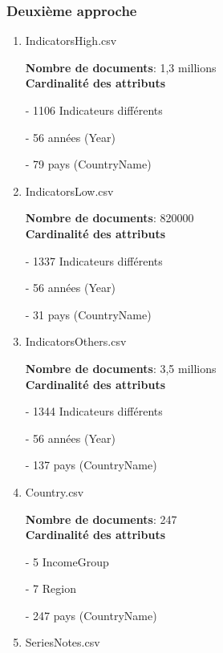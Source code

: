  \subsubsection{Deuxième approche}

\begin{enumerate}
    \item IndicatorsHigh.csv
\vspace{2mm}

\textbf{Nombre de documents}: 1,3 millions \\
\textbf{Cardinalité des attributs}

     - 1106 Indicateurs différents 
     
     - 56 années (Year)
     
     - 79 pays (CountryName)

     \item IndicatorsLow.csv
\vspace{2mm}

\textbf{Nombre de documents}: 820000 \\
\textbf{Cardinalité des attributs}

     - 1337 Indicateurs différents 
     
     - 56 années (Year)
     
     - 31 pays (CountryName)

     \item IndicatorsOthers.csv
\vspace{2mm}

\textbf{Nombre de documents}: 3,5 millions \\
\textbf{Cardinalité des attributs}

     - 1344 Indicateurs différents 
     
     - 56 années (Year)
     
     - 137 pays (CountryName)

\vspace{2mm}
    \item Country.csv
\vspace{2mm}

\textbf{Nombre de documents}: 247 \\
\textbf{Cardinalité des attributs}

     - 5 IncomeGroup
     
     - 7 Region
     
     - 247 pays (CountryName)

\vspace{2mm}
    \item SeriesNotes.csv
\vspace{2mm}


\end{enumerate}
